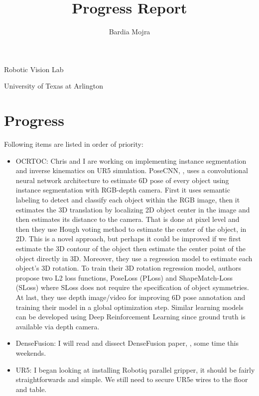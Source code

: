 \documentclass[11pt]{article}
\title{Progress Report}
\author{Bardia Mojra}
\begin{document}
\maketitle
\thispagestyle{empty}

\begin{center}
	\bigskip
	\bigskip
	Robotic Vision Lab

	University of Texas at Arlington
\end{center}

\newpage

\section{Progress}
Following items are listed in order of priority:
\begin{itemize}

	\item OCRTOC: Chris and I are working on implementing instance segmentation and inverse kinematics on UR5 simulation. PoseCNN, \cite{PoseCNN}, uses a convolutional neural network architecture to estimate 6D pose of every object using instance segmentation with RGB-depth camera. First it uses semantic labeling to detect and classify each object within the RGB image, then it estimates the 3D translation by localizing 2D object center in the image and then estimates its distance to the camera. That is done at pixel level and then they use Hough voting method to estimate the center of the object, in 2D. This is a novel approach, but perhaps it could be improved if we first estimate the 3D contour of the object then estimate the center point of the object directly in 3D. Moreover, they use a regression model to estimate each object's 3D rotation. To train their 3D rotation regression model, authors propose two L2 loss functions, PoseLoss (PLoss) and ShapeMatch-Loss (SLoss) where SLoss does not require the specification of object symmetries. At last, they use depth image/video for improving 6D pose annotation and training their model in a global optimization step. Similar learning models can be developed using Deep Reinforcement Learning since ground truth is available via depth camera.

	\item DenseFusion: I will read and dissect DenseFusion paper, \cite{DenseFusion}, some time this weekends.

	\item UR5: I began looking at installing Robotiq parallel gripper, it should be fairly straightforwards and simple. We still need to secure UR5e wires to the floor and table.


\end{itemize}
\end{document}
